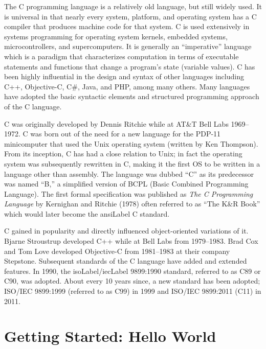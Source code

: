 

The C programming language is a relatively old language, but still widely 
used.  It is universal in that nearly every system, platform, and operating system
has a C compiler that produces machine code for that system.  C is used extensively
in systems programming for operating system kernels, embedded systems, microcontrollers, 
and supercomputers.  It is generally an ``imperative'' language which is a paradigm that
characterizes computation in terms of executable statements and functions that change 
a program's state (variable values).  C has been highly influential in 
the design and syntax of other
languages including C++, Objective-C, C\#, Java, and PHP, among many others.  
Many languages have adopted the basic syntactic elements and structured programming 
approach of the C language.

C was originally developed by Dennis Ritchie while at AT\&T Bell Labs 1969--1972.  C was
born out of the need for a new language for the PDP-11 minicomputer that used the 
Unix operating system (written by Ken Thompson).  From its inception, C has had a close relation to Unix; in fact the
operating system was subsequently rewritten in C, making it the first OS to be written in 
a language other than assembly.  The language was dubbed ``C'' as its predecessor was
named ``B,'' a simplified version of BCPL (Basic Combined Programming Language).  
The first formal specification was published as \emph{The C Programming Language} by
Kernighan and Ritchie (1978) \cite{Kernighan:1988:CPL:576122} often referred to as 
``The K\&R Book'' which would later become the \gls{ansiLabel} C standard.

C gained in popularity and directly influenced object-oriented variations of it.  
Bjarne Stroustrup developed C++ while at Bell Labs from 1979--1983.  
Brad Cox and Tom Love developed Objective-C from 1981--1983 at their
company Stepstone.  Subsequent standards of the C language have added
and extended features.  In 1990, the \gls{isoLabel}/\gls{iecLabel} 9899:1990 
standard, referred to as C89 or C90, was adopted.  About every 10 years 
since, a new standard has been adopted; ISO/IEC 9899:1999 (referred
to as C99) in 1999 and ISO/IEC 9899:2011 (C11) in 2011.

\section{Getting Started: Hello World}


